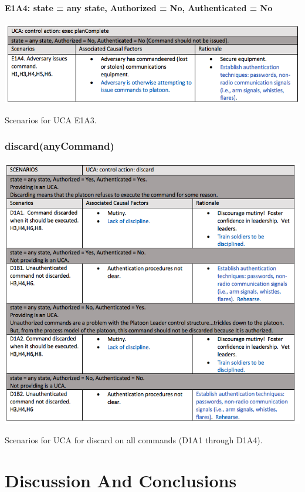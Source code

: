 \documentclass[../../main/main.tex]{subfiles}
\begin{document}
\paragraph*{E1A4: state  = any state, Authorized = No, Authenticated = No}

\begin{table}[ht!]
\begin{center}
\includegraphics[width=\linewidth]{../figures/ucae1a4}
\caption{Scenarios for UCA E1A3.}
\label{ucae1a4}
\end{center}
\end{table}
\clearpage


\subsubsection*{discard(anyCommand)}

\begin{table}[ht!]
\begin{center}
\includegraphics[width=\linewidth]{../figures/ucadiscard}
\caption{Scenarios for UCA for discard on all commands (D1A1 through D1A4).}
\label{ucadiscard}
\end{center}
\end{table}
\clearpage

\section{Discussion And Conclusions}\label{chp:stpapb:discuss}
\end{document}
